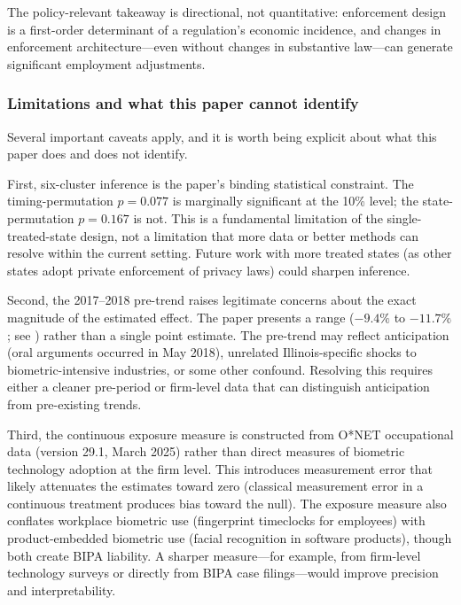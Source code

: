 \documentclass[12pt]{article}
\begin{document}
The policy-relevant takeaway is directional, not quantitative: enforcement design is a first-order determinant of a regulation's economic incidence, and changes in enforcement architecture---even without changes in substantive law---can generate significant employment adjustments.

\subsubsection*{Limitations and what this paper cannot identify} Several important caveats apply, and it is worth being explicit about what this paper does and does not identify.

First, six-cluster inference is the paper's binding statistical constraint. The timing-permutation $p = 0.077$ is marginally significant at the 10\% level; the state-permutation $p = 0.167$ is not. This is a fundamental limitation of the single-treated-state design, not a limitation that more data or better methods can resolve within the current setting. Future work with more treated states (as other states adopt private enforcement of privacy laws) could sharpen inference.

Second, the 2017--2018 pre-trend raises legitimate concerns about the exact magnitude of the estimated effect. The paper presents a range ($-9.4\%$ to $-11.7\%$; see ) rather than a single point estimate. The pre-trend may reflect anticipation (oral arguments occurred in May 2018), unrelated Illinois-specific shocks to biometric-intensive industries, or some other confound. Resolving this requires either a cleaner pre-period or firm-level data that can distinguish anticipation from pre-existing trends.

Third, the continuous exposure measure is constructed from O*NET occupational data (version 29.1, March 2025) rather than direct measures of biometric technology adoption at the firm level. This introduces measurement error that likely attenuates the estimates toward zero (classical measurement error in a continuous treatment produces bias toward the null). The exposure measure also conflates workplace biometric use (fingerprint timeclocks for employees) with product-embedded biometric use (facial recognition in software products), though both create BIPA liability. A sharper measure---for example, from firm-level technology surveys or directly from BIPA case filings---would improve precision and interpretability.
\end{document}
